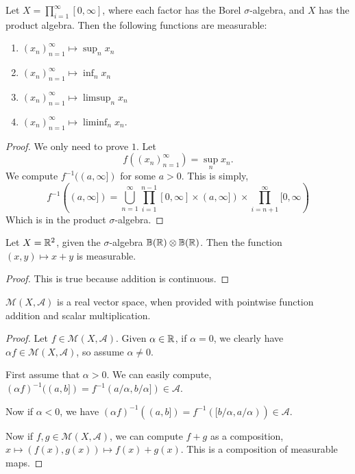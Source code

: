 \documentclass{owmaths}
\begin{document}
\begin{lemma}
    Let $X = \prod_{i=1}^\infty[0,\infty]$, where each factor has the Borel
    $\sigma$-algebra, and $X$ has the product algebra. Then the following functions
    are measurable:
    \begin{enumerate}
        \item{} $(x_n)_{n=1}^\infty \mapsto \sup_n x_n$
        \item{} $(x_n)_{n=1}^\infty \mapsto \inf_n x_n$
        \item{} $(x_n)_{n=1}^\infty \mapsto \limsup_n x_n$
        \item{} $(x_n)_{n=1}^\infty \mapsto \liminf_n x_n$.
    \end{enumerate}
\end{lemma}
\begin{proof}
    We only need to prove $1$. Let
    \begin{equation*}
        f((x_n)_{n=1}^\infty) = \sup_n x_n.
    \end{equation*}
    We compute $f^{-1}((a,\infty])$ for some $a > 0$. This is simply,
    \begin{equation*}
        f^{-1}((a,\infty]) = \bigcup_{n=1}^\infty \prod_{i=1}^{n-1} [0,\infty]\times (a,\infty])\times\prod_{i=n+1}^\infty [0,\infty)
    \end{equation*}
    Which is in the product $\sigma$-algebra.
\end{proof}

\begin{lemma}
    Let $X = \mathbb{R}^2$, given the $\sigma$-algebra $\mathbb{B}(\mathbb{R})\otimes \mathbb{B}(\mathbb{R})$.
    Then the function $(x,y)\mapsto x+y$ is measurable.
\end{lemma}
\begin{proof}
    This is true
    because addition is continuous. 
\end{proof} 


\begin{proposition}
    $\mathcal{M}(X,\mathcal{A})$ is a real vector space, when provided
    with pointwise function addition and scalar multiplication.
\end{proposition}
\begin{proof}
    Let $f \in \mathcal{M}(X,\mathcal{A})$. Given $\alpha \in \mathbb{R}$, if $\alpha = 0$,
    we clearly have $\alpha f \in \mathcal{M}(X,\mathcal{A})$, so assume $\alpha \neq 0$.
    
    First assume that $\alpha > 0$. We can easily compute, $(\alpha f)^{-1}((a,b]) = f^{-1}(a/\alpha,b/\alpha]) \in \mathcal{A}$.
    
    Now if $\alpha < 0$, we have $(\alpha f)^{-1}((a,b]) = f^{-1}([b/\alpha,a/\alpha)) \in \mathcal{A}$.
    
    Now if $f,g \in \mathcal{M}(X,\mathcal{A})$, we can compute $f+g$ as a composition,
    $x \mapsto (f(x),g(x))\mapsto f(x) + g(x)$. This is a composition of measurable maps.
\end{proof}
\end{document}
